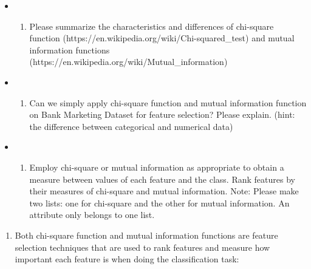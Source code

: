 \documentclass[11pt]{article}
\providecommand{\tightlist}{%
      \setlength{\itemsep}{0pt}\setlength{\parskip}{0pt}}
\begin{document}
\begin{itemize}
\item
  \begin{enumerate}
  \def\labelenumi{\alph{enumi})}
  \tightlist
  \item
    Please summarize the characteristics and differences of chi-square
    function (https://en.wikipedia.org/wiki/Chi-squared\_test) and
    mutual information functions
    (https://en.wikipedia.org/wiki/Mutual\_information)
  \end{enumerate}
\item
  \begin{enumerate}
  \def\labelenumi{\alph{enumi})}
  \setcounter{enumi}{1}
  \tightlist
  \item
    Can we simply apply chi-square function and mutual information
    function on Bank Marketing Dataset for feature selection? Please
    explain. (hint: the difference between categorical and numerical
    data)
  \end{enumerate}
\item
  \begin{enumerate}
  \def\labelenumi{\alph{enumi})}
  \setcounter{enumi}{2}
  \tightlist
  \item
    Employ chi-square or mutual information as appropriate to obtain a
    measure between values of each feature and the class. Rank features
    by their measures of chi-square and mutual information. Note: Please
    make two lists: one for chi-square and the other for mutual
    information. An attribute only belongs to one list.
  \end{enumerate}
\end{itemize}

    \begin{enumerate}
\def\labelenumi{\alph{enumi})}
\tightlist
\item
  Both chi-square function and mutual information functions are feature
  selection techniques that are used to rank features and measure how
  important each feature is when doing the classification task:
\end{enumerate}
\end{document}
